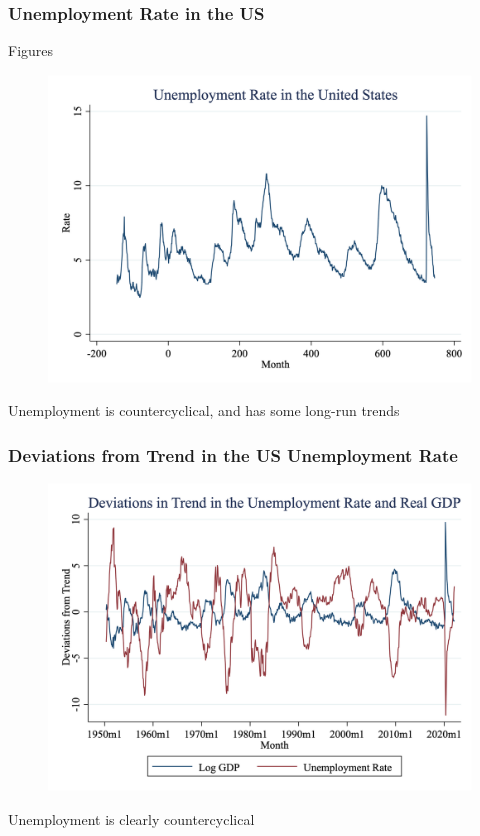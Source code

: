 \documentclass{beamer}
\begin{document}
\begin{frame}
\frametitle[alignment=center]{Unemployment Rate in the US}Figures
\begin{figure}
\centering
\includegraphics[scale=0.25]{Figures/Fig_6pt1.png}
\end{figure}
Unemployment is countercyclical, and has some long-run trends
\end{frame}

\begin{frame}
\frametitle[alignment=center]{Deviations from Trend in the US Unemployment Rate}
\begin{figure}
\centering
\includegraphics[scale=0.25]{Figures/Fig_6pt2.png}
\end{figure}
Unemployment is clearly countercyclical
\end{frame}
\end{document}
